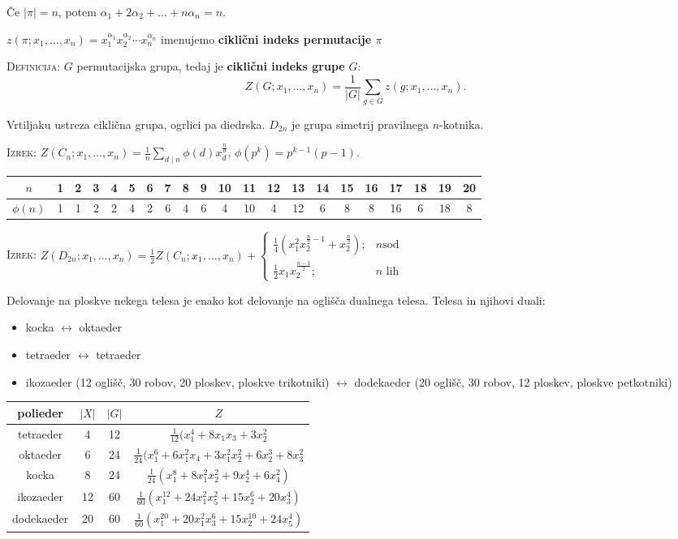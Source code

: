 \documentclass[8pt,a4paper]{amsart}
\theoremstyle{definition} %
\theoremstyle{plain} %
\begin{document}
Če $|\pi| = n$, potem $\alpha_1 + 2\alpha_2 + \ldots + n\alpha_n= n$.

$z(\pi ; x_1,\ldots ,x_n)=x_1^{\alpha_1}x_2^{\alpha_2}\cdots x_n^{\alpha_n}$
imenujemo \textbf{ciklični indeks permutacije $\pi$}

\textsc{Definicija:} $G$ permutacijska grupa, tedaj je \textbf{ciklični indeks
grupe} $G$:
$$ Z(G;x_1,\ldots ,x_n) = \frac{1}{|G|} \sum_{g\in G} z(g;x_1,\ldots ,x_n).$$

Vrtiljaku ustreza ciklična grupa, ogrlici pa diedrska. $D_{2n}$ je grupa
simetrij pravilnega $n$-kotnika.

\textsc{Izrek:} $Z(C_n; x_1,\ldots, x_n) = \frac{1}{n} \displaystyle \sum_{d
\mid n} \phi (d)x_d^{\frac{n}{d}}$, \quad $\phi(p^k) = p^{k-1}(p-1)$.

\begin{tabular}[h!]{*{21}{|c}|} \hline
$n$ & 1 & 2 & 3 & 4 & 5 & 6 & 7 & 8 & 9 & 10 & 11 & 12 & 13 & 14 & 15 & 16 & 17 & 18 &
19 & 20 \\ \hline
$\phi(n)$ & 1 & 1 & 2 & 2 & 4 & 2 & 6 & 4 & 6 & 4 & 10 & 4 & 12 & 6    & 8 & 8  & 16 & 6 &
18 & 8  \\ \hline
\end{tabular}


\textsc{Izrek:} $Z(D_{2n}; x_1,\ldots,x_n) = \frac{1}{2} Z(C_n;x_1,\ldots,x_n) +
\begin{cases} \frac{1}{4}(x_1^2x_2^{\frac{n}{2}-1}+x_2^{\frac{n}{2}});& n \text{
  sod} \\ \frac{1}{2}x_1x_2^{\frac{n-1}{2}};& n \text{ lih} \end{cases}$

Delovanje na ploskve nekega telesa je enako kot delovanje na oglišča dualnega
telesa. Telesa in njihovi duali:
\begin{itemize}
  \item kocka $\leftrightarrow$ oktaeder
  \item tetraeder $\leftrightarrow$ tetraeder
  \item ikozaeder (12 oglišč, 30 robov, 20 ploskev, ploskve trikotniki) $\leftrightarrow$ dodekaeder (20
    oglišč, 30 robov, 12 ploskev, ploskve petkotniki)
\end{itemize}

\begin{tabular}{| c || c | c | c |}\hline
  polieder & $|X|$ & $|G|$ & $Z$ \\ \hline\hline
  tetraeder & 4 & 12 & $\frac{1}{12}(x_1^4+8x_1x_3 + 3x_2^2$\\ \hline
  oktaeder & 6 & 24 & $\frac{1}{24}(x_1^6+6x_1^2x_4 + 3x_1^2x_2^2+6x_2^3+8x_3^2$\\ \hline
  kocka & 8 & 24 & $\frac{1}{24}(x_1^8+8x_1^2x_2^2 + 9x_2^4 + 6x_4^2)$ \\ \hline
  ikozaeder & 12 & 60 & $\frac{1}{60}(x_1^{12} + 24x_1^2x_5^2 + 15x_2^6 + 20x_3^4)$ \\ \hline
  dodekaeder & 20 & 60 & $\frac{1}{60}(x_1^{20} + 20x_1^2x_3^6 + 15x_2^{10} + 24x_5^4)$ \\ \hline
\end{tabular}
\end{document}
